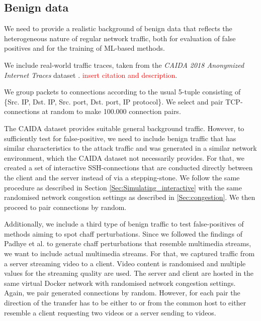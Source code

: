 \documentclass[runningheads]{llncs}\usepackage[]{graphicx}\usepackage[]{color}
\begin{document}


 
\subsection{Benign data}

We need to provide a realistic background of benign data that reflects the heterogeneous nature of regular network traffic, both for evaluation of false positives and for the training of ML-based methods.

We include real-world traffic traces, taken from the \textit{CAIDA 2018 Anonymized Internet Traces} dataset \cite{CAIDA2018}.
\textcolor{red}{insert citation and description}. 

We group packets to connections according to the usual 5-tuple consisting of \{Src. IP, Dst. IP, Src. port, Dst. port, IP protocol\}. We select and pair TCP-connections at random to make 100.000 connection pairs. 

The CAIDA dataset provides suitable general background traffic. However, to sufficiently test for false-positive, we need to include benign traffic that has similar characteristics to the attack traffic and was generated in a similar network environment, which the CAIDA dataset not necessarily provides. For that, we created a set of interactive SSH-connections that are conducted directly between the client and the server instead of via a stepping-stone. We follow the same procedure as described in Section \ref{Sec:Simulating_interactive} with the same randomised network congestion settings as described in \ref{Sec:congestion}. We then proceed to pair connections by random.

Additionally, we include a third type of benign traffic to test false-positives of methods aiming to spot chaff perturbations. Since we followed the findings of Padhye et al. \cite{padhye2010evading} to generate chaff perturbations that resemble multimedia streams, we want to include actual multimedia streams. For that, we captured traffic from a server streaming video to a client. Video content is randomised and multiple values for the streaming quality are used.
The server and client are hosted in the same virtual Docker network with randomised network congestion settings. Again, we pair generated connections by random. However, for each pair the direction of the transfer has to be either to or from the common host to either resemble a client requesting two videos or a server sending to videos.
\end{document}
